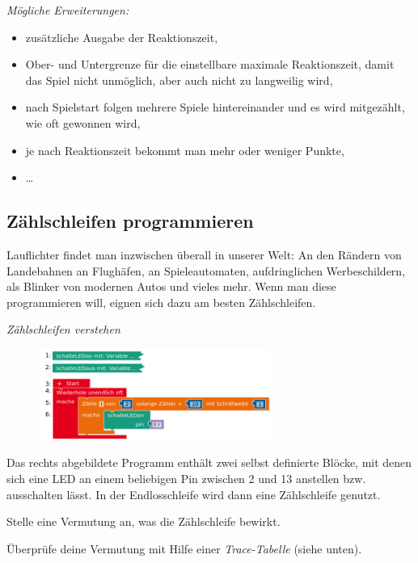 \emph{Mögliche Erweiterungen:}
\begin{itemize}[itemsep=0ex, parsep=0ex]
	\item zusätzliche Ausgabe der Reaktionszeit,
	\item Ober- und Untergrenze für die einstellbare maximale Reaktionszeit, damit das Spiel nicht unmöglich, aber auch nicht zu langweilig wird,
	\item nach Spielstart folgen mehrere Spiele hintereinander und es wird mitgezählt, wie oft gewonnen wird,
	\item je nach Reaktionszeit bekommt man mehr oder weniger Punkte,
	\item \dots
\end{itemize}

\newpage
\subsection{Zählschleifen programmieren}
\label{sec:for-schleife}

Lauflichter findet man inzwischen überall in unserer Welt: An den Rändern von Landebahnen an Flughäfen, an Spieleautomaten, aufdringlichen Werbeschildern, als Blinker von modernen Autos und vieles mehr. Wenn man diese programmieren will, eignen sich dazu am besten Zählschleifen.

\medskip
\begin{aufgabe} \emph{Zählschleifen verstehen}
	
	\begin{figure}
		\centering
		\vspace{-0.5\baselineskip}
		\includegraphics[width=0.68\textwidth]{./pics/for-schleife-bsp.png}
	\end{figure}
	Das rechts abgebildete Programm enthält zwei selbst definierte Blöcke, mit denen sich eine LED an einem beliebigen Pin zwischen 2 und 13 anstellen bzw. ausschalten lässt. In der Endlosschleife wird dann eine Zählschleife genutzt.
	
	\medskip
	Stelle eine Vermutung an, was die Zählschleife bewirkt.
	
	\medskip
	Überprüfe deine Vermutung mit Hilfe einer \emph{Trace-Tabelle} (siehe unten).
\end{aufgabe}


